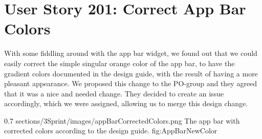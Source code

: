 \section{User Story 201: Correct App Bar Colors}
With some fiddling around with the app bar widget, we found out that we could easily correct the simple singular orange color of the app bar, to have the gradient colors documented in the design guide, with the result of having a more pleasant appearance. We proposed this change to the PO-group and they agreed that it was a nice and needed change. They decided to create an issue accordingly, which we were assigned, allowing us to merge this design change. 


        {0.7} %
        {sections/3Sprint/images/appBarCorrectedColors.png} %
        {The app bar with corrected colors according to the design guide.} %
        {fig:AppBarNewColor} %